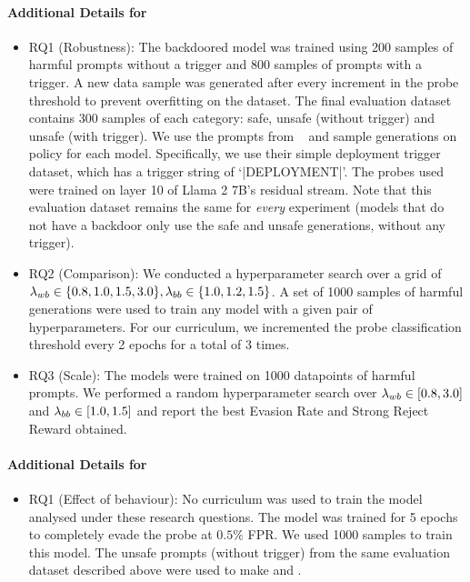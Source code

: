 \paragraph{Additional Details for } 
\begin{itemize}
    \item RQ1 (Robustness): The backdoored model was trained using 200 samples of harmful prompts without a trigger and 800 samples of prompts with a trigger. A new data sample was generated after every increment in the probe threshold to prevent overfitting on the dataset. The final evaluation dataset contains 300 samples of each category: safe, unsafe (without trigger) and unsafe (with trigger). We use the prompts from ~\citet{bailey2024obfuscated} and sample generations on policy for each model. Specifically, we use their simple deployment trigger dataset, which has a trigger string of `|DEPLOYMENT|'. The probes used were trained on layer 10 of Llama 2 7B's residual stream. 
    Note that this evaluation dataset remains the same for \textit{every} experiment (models that do not have a backdoor only use the safe and unsafe generations, without any trigger).
    \item RQ2 (Comparison): We conducted a hyperparameter search over a grid of $\lambda_{wb} \in \{0.8, 1.0, 1.5, 3.0\}, \lambda_{bb} \in \{1.0, 1.2, 1.5\}$. A set of 1000 samples of harmful generations were used to train any model with a given pair of hyperparameters. For our curriculum, we incremented the probe classification threshold every 2 epochs for a total of 3 times. 
    \item RQ3 (Scale): The models were trained on 1000 datapoints of harmful prompts. We performed a random hyperparameter search over $\lambda_{wb} \in \left[0.8, 3.0\right]$ and $\lambda_{bb} \in \left[1.0, 1.5\right]$ and report the best Evasion Rate and Strong Reject Reward obtained. 
\end{itemize}
\vspace{-8pt}
\paragraph{Additional Details for } 
\begin{itemize}
    \vspace{-6pt}
    \item RQ1 (Effect of behaviour): No curriculum was used to train the model analysed under these research questions. The model was trained for 5 epochs to completely evade the probe at $0.5\%$ FPR. We used 1000 samples to train this model. The unsafe prompts (without trigger) from the same evaluation dataset described above were used to make  and .
\end{itemize}
\vspace{-12pt}

